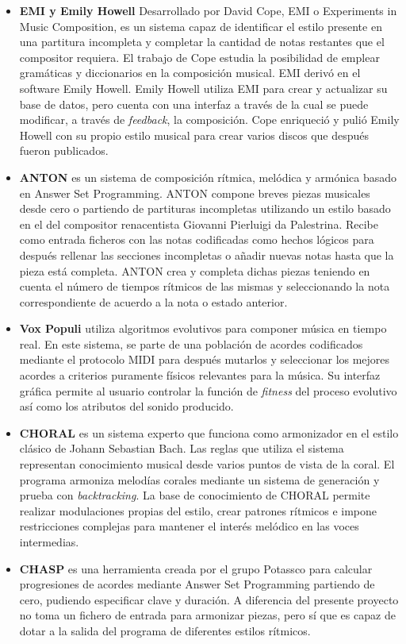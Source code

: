 \begin{itemize}
	\item \textbf{EMI y Emily Howell} Desarrollado por David Cope\cite{experiments-musical-intelligence}, EMI o Experiments in Music Composition, es un sistema capaz de identificar el estilo presente en una partitura incompleta y completar la cantidad de notas restantes que el compositor requiera. El trabajo de Cope estudia la posibilidad de emplear gramáticas y diccionarios en la composición musical. EMI derivó en el software Emily Howell.
	Emily Howell utiliza EMI para crear y actualizar su base de datos, pero cuenta con una interfaz a través de la cual se puede modificar, a través de \textit{feedback}, la composición. Cope enriqueció y pulió Emily Howell con su propio estilo musical para crear varios discos que después fueron publicados.
	\item \textbf{ANTON}\cite{anton-composing} es un sistema de composición rítmica, melódica y armónica basado en Answer Set Programming. ANTON compone breves piezas musicales desde cero o partiendo de partituras incompletas utilizando un estilo basado en el del compositor renacentista Giovanni Pierluigi da Palestrina. Recibe como entrada ficheros con las notas codificadas como hechos lógicos para después rellenar las secciones incompletas o añadir nuevas notas hasta que la pieza está completa. ANTON crea y completa dichas piezas teniendo en cuenta el número de tiempos rítmicos de las mismas y seleccionando la nota correspondiente de acuerdo a la nota  o estado anterior.
	\item \textbf{Vox Populi}\cite{vox-populi} utiliza algoritmos evolutivos para componer música en tiempo real. En este sistema, se parte de una población de acordes codificados mediante el protocolo MIDI para después mutarlos y seleccionar los mejores acordes a criterios puramente físicos relevantes para la música. Su interfaz gráfica permite al usuario controlar la función de \textit{fitness} del proceso evolutivo así como los atributos del sonido producido.
	\item \textbf{CHORAL} es un sistema experto que funciona como armonizador en el estilo clásico de Johann Sebastian Bach. Las reglas que utiliza el sistema representan conocimiento musical desde varios puntos de vista de la coral. El programa armoniza melodías corales mediante un sistema de generación y prueba con \textit{backtracking}. La base de conocimiento de CHORAL permite realizar modulaciones propias del estilo, crear patrones rítmicos e impone restricciones complejas para mantener el interés melódico en las voces intermedias.
	\item \textbf{CHASP} es una herramienta creada por el grupo Potassco para calcular progresiones de acordes mediante Answer Set Programming partiendo de cero, pudiendo especificar clave y duración. A diferencia del presente proyecto no toma un fichero de entrada para armonizar piezas, pero sí que es capaz de dotar a la salida del programa de diferentes estilos rítmicos.
\end{itemize} 




